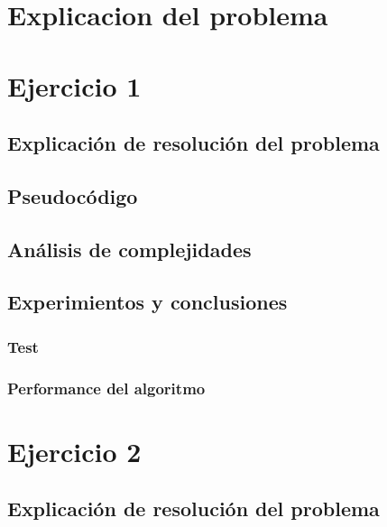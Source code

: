 \documentclass[12pt, a4paper]{article}
\begin{document}
\maketitle
\tableofcontents
\newpage

\newpage
\section{Explicacion del problema}

\newpage
\section{Ejercicio 1} 
\subsection{Explicaci\'on de resoluci\'on del problema}

\subsection{Pseudoc\'odigo}

\subsection{An\'alisis de complejidades}

%
\subsection{Experimientos y conclusiones}
\subsubsection[1.5]{Test}

\subsubsection[1.5]{Performance del algoritmo}
%

\newpage
\section{Ejercicio 2} 
\subsection{Explicaci\'on de resoluci\'on del problema}

\end{document}
